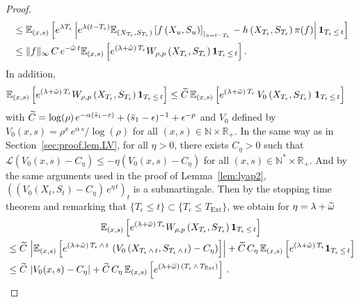\documentclass[10pt]{amsart}
\theoremstyle{definition}\newtheorem{defi}[theo]{Definition}\newtheorem{rema}[theo]{Remark}\newtheorem{exam}[theo]{Example}\newtheorem{exem}[theo]{Example}\newtheorem{nota}[theo]{Notation}
\newcommand{\RR}{\mathbb{R}}
\newcommand{\NN}{\mathbb{N}}
\newcommand{\EE}{\mathbb{E}}
\newcommand{\clL}{\mathcal{L}}
\newcommand{\Text}{T_{\mathrm{Ext}}}
\newcommand{\1}{\mathbf{1}}
\let\oldtilde\tilde
\renewcommand*{\tilde}[1]{\mathchoice{\widetilde{#1}}{\widetilde{#1}}{\oldtilde{#1}}{\oldtilde{#1}}}
\begin{document}
\begin{proof}
\begin{multline}
\begin{aligned}
&\leq
\EE_{(x,s)} \left[e^{\lambda T_\epsilon} \left| e^{\lambda(t-T_\epsilon)}
\EE_{\left(X_{T_\epsilon},S_{T_\epsilon}\right)}\left[f\left(X_{u},S_{u}\right) \right]_{\vert_{u=t-T_\epsilon}}-h\left(X_{T_\epsilon},S_{T_\epsilon}\right)\pi(f)\right| \1_{T_\epsilon\,\leq\,t} \right]\\
&\leq \|f\|_\infty\,C\,e^{-\tilde\omega\,t}
\EE_{(x,s)} \left[e^{\left(\lambda+\tilde\omega\right)\,T_\epsilon}W_{\rho,p}\left(X_{T_\epsilon},S_{T_\epsilon}\right) \1_{T_\epsilon\,\leq\,t} \right].
\end{aligned}
\end{multline}
In addition,
\begin{align*}
\EE_{(x,s)} \left[e^{\left(\lambda+\tilde \omega\right)\, T_\epsilon}W_{\rho,p}\left(X_{T_\epsilon},S_{T_\epsilon}\right) \1_{T_\epsilon\,\leq\,t} \right] &\leq
\tilde C\, \EE_{(x,s)} \left[e^{\left(\lambda+\tilde\omega\right)\, T_\epsilon} \,V_0\left(X_{T_\epsilon},S_{T_\epsilon}\right) \, \1_{T_\epsilon\,\leq\,t} \right]
\end{align*}
with $\tilde C=\log(\rho)\,e^{-\alpha(\bar s_1-\varepsilon)}+(\bar s_1-\epsilon)^{-1}+\epsilon^{-p}$ and $V_0$ defined by $V_0(x,s)=\rho^{x}\,e^{\alpha\,s}/\log(\rho)$ for all $(x,s)\in \NN\times \RR_+$. In the same way as in Section~\ref{sec:proof.lem.LV}, for all $\eta>0$, there exists $C_\eta>0$ such that $\clL(V_0(x,s)-C_\eta)\leq -\eta (V_0(x,s) - C_\eta)$ for all $(x,s)\in \NN^*\times \RR_+$. And by the same arguments used in the proof of Lemma~\ref{lem:lyap2}, $((V_0(X_t,S_t)-C_\eta)\,e^{\eta\,t})_t$ is a submartingale. Then by the stopping time theorem and remarking that $\{T_\epsilon\leq t\} \subset \{T_\epsilon\leq \Text\}$, we obtain for $\eta=\lambda+\tilde \omega$
\begin{multline}\label{eq:dom.exp.T_eps.V_0}
\EE_{(x,s)} \left[e^{(\lambda+\tilde\omega)\, T_\epsilon}W_{\rho,p}\left(X_{T_\epsilon},S_{T_\epsilon}\right) \1_{T_\epsilon\,\leq\,t} \right]
\\
\begin{aligned} 
&\leq
\tilde C\, \left|\EE_{(x,s)} \left[e^{\left(\lambda+\tilde\omega\right)\, T_\epsilon\,\wedge\,t} \,\left(V_0\left(X_{T_\epsilon\,\wedge\,t},S_{T_\epsilon\,\wedge\,t}\right)-C_\eta\right)\right]\right| +\tilde C\,C_\eta\, \EE_{(x,s)} \left[e^{\left(\lambda+\tilde\omega\right)\, T_\epsilon}\1_{T_\epsilon\,\leq\,t} \right]
\\ 
&\leq \tilde C\,\left|V_0(x,s)-C_\eta\right| +\tilde C\,C_\eta\, \EE_{(x,s)} \left[e^{\left(\lambda+\tilde\omega\right)\, \left(T_\epsilon\,\wedge \,\Text\right)} \right]\,.

\end{aligned}
\end{multline}
\end{proof}
\end{document}
